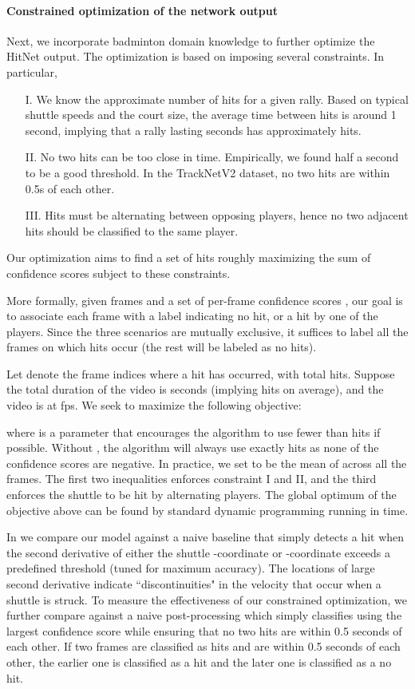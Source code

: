 \paragraph{Constrained optimization of the network output}
Next, we incorporate badminton domain knowledge to further optimize the HitNet output. The optimization is based on imposing several constraints. In particular,
\begin{itemize}[noitemsep]
\item[I.] We know the approximate number of hits for a given rally. Based on typical shuttle speeds and the court size, the average time between hits is around 1 second, implying that a rally lasting  seconds has approximately  hits.
\item[II.] No two hits can be too close in time. Empirically, we found half a second to be a good threshold. In the TrackNetV2 dataset, no two hits are within 0.5s of each other.
\item[III.] Hits must be alternating between opposing players, hence no two adjacent hits should be classified to the same player.
\end{itemize}
Our optimization aims to find a set of hits roughly maximizing the sum of confidence scores subject to these constraints.

More formally, given  frames and a set of per-frame confidence scores , our goal is to associate each frame with a label  indicating no hit, or a hit by one of the players. Since the three scenarios are mutually exclusive, it suffices to label all the frames on which hits occur (the rest will be labeled as no hits). 

Let  denote the frame indices where a hit has occurred, with  total hits. Suppose the total duration of the video is  seconds (implying  hits on average), and the video is at  fps. We seek to maximize the following objective:

where  is a parameter that encourages the algorithm to use fewer than  hits if possible. Without , the algorithm will always use exactly  hits as none of the confidence scores are negative. In practice, we set  to be the mean of  across all the frames. The first two inequalities enforces constraint I and II, and the third enforces the shuttle to be hit by alternating players. The global optimum of the objective above can be found by standard dynamic programming running in  time.

In  we compare our model against a naive baseline that simply detects a hit when the second derivative of either the shuttle -coordinate or -coordinate exceeds a predefined threshold (tuned for maximum accuracy). The locations of large second derivative indicate ``discontinuities" in the velocity that occur when a shuttle is struck. To measure the effectiveness of our constrained optimization, we further compare against a naive post-processing which simply classifies using the largest confidence score while ensuring that no two hits are within 0.5 seconds of each other. If two frames are classified as hits and are within 0.5 seconds of each other, the earlier one is classified as a hit and the later one is classified as a no hit.

